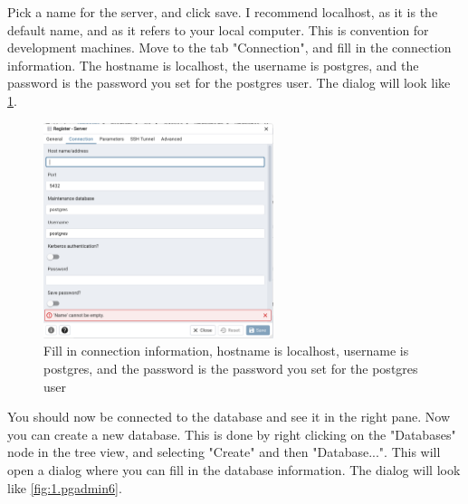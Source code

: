 

Pick a name for the server, and click save. I recommend localhost, as it is the default name, and as it refers to your local computer. This is convention for development machines. 
Move to the tab "Connection", and fill in the connection information. The hostname is localhost, the username is postgres, and the password is the password you set for the postgres user. The dialog will look like \cref{fig:1.pgadmin4}.

\begin{figure}[H]
    \centering
    \includegraphics[width=0.6\textwidth]{content/1-relational-databases/figures/pgadmin/4.png}
    \caption{Fill in connection information, hostname is localhost, username is postgres, and the password is the password you set for the postgres user}
    \label{fig:1.pgadmin4}
\end{figure}


You should now be connected to the database and see it in the right pane.
Now you can create a new database. This is done by right clicking on the "Databases" node in the tree view, and selecting "Create" and then "Database...". This will open a dialog where you can fill in the database information. The dialog will look like \cref{fig:1.pgadmin6}.

